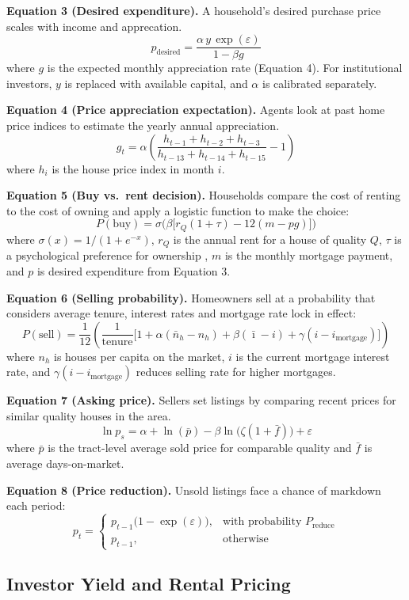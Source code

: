 \documentclass[twocolumn,showpacs,%
  nofootinbib,aps,superscriptaddress,%
  eqsecnum,prd,notitlepage,showkeys,10pt]{revtex4-1}
\begin{document}
\textbf{Equation 3 (Desired expenditure).} A household's desired purchase price scales with income and apprecation.
$$
p_{\text{desired}} = \frac{\alpha\, y\, \exp(\varepsilon)}{1 - \beta g}
$$
where $g$ is the expected monthly appreciation rate (Equation 4). For institutional investors, $y$ is replaced with available capital, and $\alpha$ is calibrated separately.
 
\textbf{Equation 4 (Price appreciation expectation).} Agents look at past home price indices to estimate the yearly annual appreciation. 
$$
g_t = \alpha \left( \frac{h_{t-1} + h_{t-2} + h_{t-3}}{h_{t-13} + h_{t-14} + h_{t-15}} - 1 \right)
$$
where $h_i$ is the house price index in month $i$.
 
\textbf{Equation 5 (Buy vs.\ rent decision).} Households compare the  cost of renting to the  cost of owning and apply a logistic function to make the choice:
$$
P(\text{buy}) = \sigma\Big(\beta \big[ r_Q(1+\tau) - 12(m - p g) \big]\Big)
$$
where $\sigma(x) = 1/(1+e^{-x})$, $r_Q$ is the annual rent for a house of quality $Q$, $\tau$ is a psychological preference for ownership , $m$ is the monthly mortgage payment, and $p$ is desired expenditure from Equation 3. 
 
\textbf{Equation 6 (Selling probability).} Homeowners sell at a probability that considers average tenure, interest rates and mortgage rate lock in effect: 
$$
P(\text{sell}) = \frac{1}{12} (\frac{1}{\text{tenure}}\Big[1 + \alpha(\bar{n}_h - n_h) + \beta(\bar{\imath} - i) + \gamma(i - i_{\text{mortgage}})\Big])
$$
where $n_h$ is houses per capita on the market, $i$ is the current mortgage interest rate, and $\gamma(i - i_{\text{mortgage}})$ reduces selling rate for higher mortgages.


\textbf{Equation 7 (Asking price).} Sellers set listings by comparing recent prices for similar quality houses in the area. 
$$
\ln p_s = \alpha + \ln(\bar{p}) - \beta \ln\big(\zeta(1+\bar{f})\big) + \varepsilon
$$
where $\bar{p}$ is the tract-level average sold price for comparable quality and $\bar{f}$ is average days-on-market. 
 
\textbf{Equation 8 (Price reduction).} Unsold listings face a chance of markdown each period:
$$
p_t = \begin{cases} p_{t-1}\big(1 - \exp(\varepsilon)\big), & \text{with probability } P_{\text{reduce}} \\ p_{t-1}, & \text{otherwise} \end{cases}
$$
 
\subsection{Investor Yield and Rental Pricing}
 
\end{document}
